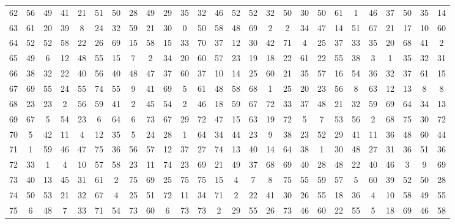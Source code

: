 \begin{table}
\begin{tabular}{c c c c c c c c c c c c c c c c c c c c c c c c c c }
62 & 56 & 49 & 41 & 21 & 51 & 50 & 28 & 49 & 29 & 35 & 32 & 46 & 52 & 52 & 32 & 50 & 30 & 50 & 61 & 1 & 46 & 37 & 50 & 35 & 14 \\
63 & 61 & 20 & 39 & 8 & 24 & 32 & 59 & 21 & 30 & 0 & 50 & 58 & 48 & 69 & 2 & 2 & 34 & 47 & 14 & 51 & 67 & 21 & 17 & 10 & 60 \\
64 & 52 & 52 & 58 & 22 & 26 & 69 & 15 & 58 & 15 & 33 & 70 & 37 & 12 & 30 & 42 & 71 & 4 & 25 & 37 & 33 & 35 & 20 & 68 & 41 & 2 \\
65 & 49 & 6 & 12 & 48 & 55 & 15 & 7 & 2 & 34 & 20 & 60 & 57 & 23 & 19 & 18 & 22 & 61 & 22 & 55 & 38 & 3 & 1 & 35 & 32 & 31 \\
66 & 38 & 32 & 22 & 40 & 56 & 40 & 48 & 47 & 37 & 60 & 37 & 10 & 14 & 25 & 60 & 21 & 35 & 57 & 16 & 54 & 36 & 32 & 37 & 61 & 15 \\
67 & 69 & 55 & 24 & 55 & 74 & 55 & 9 & 41 & 69 & 5 & 61 & 48 & 58 & 68 & 1 & 25 & 20 & 23 & 56 & 8 & 63 & 12 & 13 & 8 & 8 \\
68 & 23 & 23 & 2 & 56 & 59 & 41 & 2 & 45 & 54 & 2 & 46 & 18 & 59 & 67 & 72 & 33 & 37 & 48 & 21 & 32 & 59 & 69 & 64 & 34 & 13 \\
69 & 67 & 5 & 54 & 23 & 6 & 64 & 6 & 73 & 67 & 29 & 72 & 47 & 15 & 63 & 19 & 72 & 5 & 7 & 53 & 56 & 2 & 68 & 75 & 30 & 72 \\
70 & 5 & 42 & 11 & 4 & 12 & 35 & 5 & 24 & 28 & 1 & 64 & 34 & 44 & 23 & 9 & 38 & 23 & 52 & 29 & 41 & 11 & 36 & 48 & 60 & 44 \\
71 & 1 & 59 & 46 & 47 & 75 & 36 & 56 & 57 & 12 & 37 & 27 & 74 & 13 & 40 & 14 & 64 & 38 & 1 & 30 & 48 & 27 & 31 & 36 & 51 & 36 \\
72 & 33 & 1 & 4 & 10 & 57 & 58 & 23 & 11 & 74 & 23 & 69 & 21 & 49 & 37 & 68 & 69 & 40 & 28 & 48 & 22 & 40 & 46 & 3 & 9 & 69 \\
73 & 40 & 13 & 45 & 31 & 61 & 2 & 75 & 69 & 25 & 75 & 75 & 15 & 4 & 7 & 8 & 75 & 55 & 59 & 57 & 5 & 60 & 39 & 52 & 50 & 28 \\
74 & 50 & 53 & 21 & 32 & 67 & 4 & 25 & 51 & 72 & 11 & 34 & 71 & 2 & 22 & 41 & 30 & 26 & 55 & 18 & 36 & 4 & 10 & 58 & 49 & 55 \\
75 & 6 & 48 & 7 & 33 & 71 & 54 & 73 & 60 & 6 & 73 & 73 & 2 & 29 & 55 & 26 & 73 & 46 & 60 & 22 & 55 & 5 & 18 & 69 & 46 & 58 \\
\hline
\end{tabular}
\end{table}